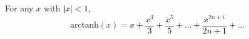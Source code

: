 For any $x$ with $|x|<1$,
\[ \mathrm{arctanh}(x) 
= x
+ \frac{x^3}{3}
+ \frac{x^5}{5}
+ ...
+ \frac{x^{2n+1}}{2n +1 } 
+ ... \]